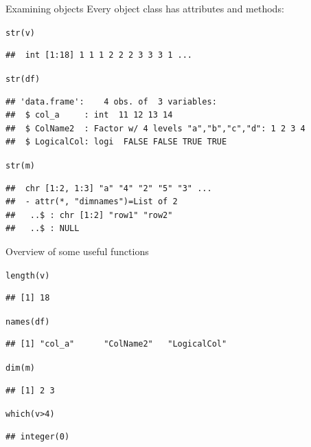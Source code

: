 \documentclass[xcolor=table,           xcolor=dvipsnames]{beamer}\usepackage[]{graphicx}\usepackage[]{color}
\makeatletter
\newcommand{\hlnum}[1]{\textcolor[rgb]{0,0,0}{#1}}
\newcommand{\hlopt}[1]{\textcolor[rgb]{0,0,0}{#1}}
\newcommand{\hlstd}[1]{\textcolor[rgb]{0,0,0}{#1}}
\newcommand{\hlkwd}[1]{\textcolor[rgb]{0,0,1}{#1}}
\newenvironment{kframe}{%
 \def\at@end@of@kframe{}%
 \ifinner\ifhmode%
  \def\at@end@of@kframe{\end{minipage}}%
  \begin{minipage}{\columnwidth}%
 \fi\fi%
 \def\FrameCommand##1{\hskip\@totalleftmargin \hskip-\fboxsep
 \colorbox{shadecolor}{##1}\hskip-\fboxsep
     \hskip-\linewidth \hskip-\@totalleftmargin \hskip\columnwidth}%
 \MakeFramed {\advance\hsize-\width
   \@totalleftmargin\z@ \linewidth\hsize
   \@setminipage}}%
 {\par\unskip\endMakeFramed%
 \at@end@of@kframe}
\newenvironment{knitrout}{}{} %
\makeatother
\begin{document}

\begin{frame}[fragile]{Examining objects}
Every object class has attributes and methods:
\begin{knitrout}\footnotesize
{}\color{fgcolor}\begin{kframe}
\begin{alltt}
\hlkwd{str}\hlstd{(v)}
\end{alltt}
\begin{verbatim}
##  int [1:18] 1 1 1 2 2 2 3 3 3 1 ...
\end{verbatim}
\begin{alltt}
\hlkwd{str}\hlstd{(df)}
\end{alltt}
\begin{verbatim}
## 'data.frame':	4 obs. of  3 variables:
##  $ col_a     : int  11 12 13 14
##  $ ColName2  : Factor w/ 4 levels "a","b","c","d": 1 2 3 4
##  $ LogicalCol: logi  FALSE FALSE TRUE TRUE
\end{verbatim}
\begin{alltt}
\hlkwd{str}\hlstd{(m)}
\end{alltt}
\begin{verbatim}
##  chr [1:2, 1:3] "a" "4" "2" "5" "3" ...
##  - attr(*, "dimnames")=List of 2
##   ..$ : chr [1:2] "row1" "row2"
##   ..$ : NULL
\end{verbatim}
\end{kframe}
\end{knitrout}
\end{frame}


\begin{frame}[fragile]{Overview of some useful functions}
\begin{knitrout}
\color{fgcolor}\begin{kframe}
\begin{alltt}
\hlkwd{length}\hlstd{(v)}
\end{alltt}
\begin{verbatim}
## [1] 18
\end{verbatim}
\begin{alltt}
\hlkwd{names}\hlstd{(df)}
\end{alltt}
\begin{verbatim}
## [1] "col_a"      "ColName2"   "LogicalCol"
\end{verbatim}
\begin{alltt}
\hlkwd{dim}\hlstd{(m)}
\end{alltt}
\begin{verbatim}
## [1] 2 3
\end{verbatim}
\begin{alltt}
\hlkwd{which}\hlstd{(v} \hlopt{>} \hlnum{4}\hlstd{)}
\end{alltt}
\begin{verbatim}
## integer(0)
\end{verbatim}
\end{kframe}
\end{knitrout}
\end{frame}
\end{document}
